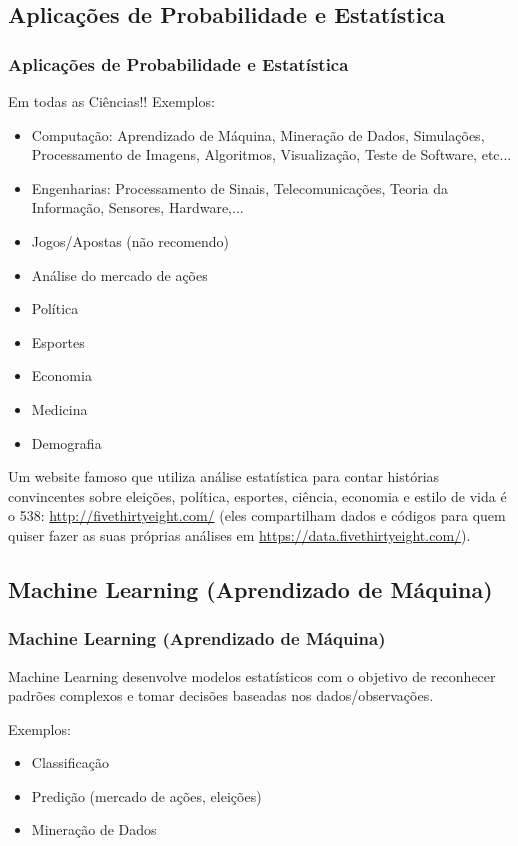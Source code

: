 \documentclass[pdf,9pt,xcolor=dvipsnames,hide notes]{beamer}\usepackage[]{graphicx}\usepackage[]{color}
\begin{document}

\subsection{Aplicações de Probabilidade e Estatística}
\begin{frame}\frametitle{Aplicações de Probabilidade e Estatística}
  Em todas as Ciências!! Exemplos:
  \begin{itemize}
    \item Computação: Aprendizado de Máquina, Mineração de Dados, Simulações, Processamento de Imagens, Algoritmos, Visualização, Teste de Software, etc...
    \item Engenharias: Processamento de Sinais, Telecomunicações, Teoria da Informação, Sensores, Hardware,...
    \item Jogos/Apostas (não recomendo)
    \item Análise do mercado de ações
    \item Política
    \item Esportes
    \item Economia
    \item Medicina
    \item Demografia
  \end{itemize}
  
  Um website famoso que utiliza análise estatística para contar histórias convincentes sobre eleições, política, esportes, ciência, economia e estilo de vida é o 538: \url{http://fivethirtyeight.com/} (eles compartilham dados e códigos para quem quiser fazer as suas próprias análises em \url{https://data.fivethirtyeight.com/}).
  \end{frame}
  
\subsection{Machine Learning (Aprendizado de Máquina)}
\begin{frame}\frametitle{Machine Learning (Aprendizado de Máquina)}
Machine Learning desenvolve modelos estatísticos com o objetivo de reconhecer padrões complexos e tomar decisões baseadas nos dados/observações.

Exemplos:

\begin{itemize}
  \item Classificação
  \item Predição (mercado de ações, eleições)
  \item Mineração de Dados
\end{itemize}

\end{frame}
\end{document}
